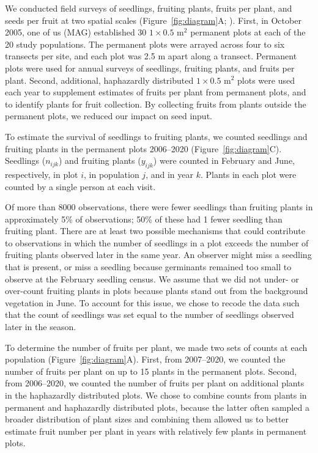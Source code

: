 \documentclass[12pt, oneside, titlepage]{article}   	%
\begin{document}
We conducted field surveys of seedlings, fruiting plants, fruits per plant, and seeds per fruit at two spatial scales (Figure~\ref{fig:diagram}A; \cite{eckhart2011}). First, in October 2005, one of us (MAG) established 30 $1\times0.5$ m$^2$ permanent plots at each of the 20 study populations. The permanent plots were arrayed across four to six transects per site, and each plot was 2.5 m apart along a transect. Permanent plots were used for annual surveys of seedlings, fruiting plants, and fruits per plant. Second, additional, haphazardly distributed $1\times0.5$ m$^2$ plots were used each year to supplement estimates of fruits per plant from permanent plots, and to identify plants for fruit collection. By collecting fruits from plants outside the permanent plots, we reduced our impact on seed input.

To estimate the survival of seedlings to fruiting plants, we counted seedlings and fruiting plants in the permanent plots 2006--2020 (Figure~\ref{fig:diagram}C). Seedlings ($n_{ijk}$) and fruiting plants ($y_{ijk}$) were counted in February and June, respectively, in plot $i$, in population $j$, and in year $k$. Plants in each plot were counted by a single person at each visit. 

Of more than 8000 observations, there were fewer seedlings than fruiting plants in approximately 5\% of observations; 50\% of these had 1 fewer seedling than fruiting plant. There are at least two possible mechanisms that could contribute to observations in which the number of seedlings in a plot exceeds the number of fruiting plants observed later in the same year. An observer might miss a seedling that is present, or miss a seedling because germinants remained too small to observe at the February seedling census. We assume that we did not under- or over-count fruiting plants in plots because plants stand out from the background vegetation in June. To account for this issue, we chose to recode the data such that the count of seedlings was set equal to the number of seedlings observed later in the season. 

To determine the number of fruits per plant, we made two sets of counts at each population (Figure~\ref{fig:diagram}A). First, from 2007--2020, we counted the number of fruits per plant on up to 15 plants in the permanent plots. Second, from 2006--2020, we counted the number of fruits per plant on additional plants in the haphazardly distributed plots. We chose to combine counts from plants in permanent and haphazardly distributed plots, because the latter often sampled a broader distribution of plant sizes and combining them allowed us to better estimate fruit number per plant in years with relatively few plants in permanent plots. 
\end{document}
